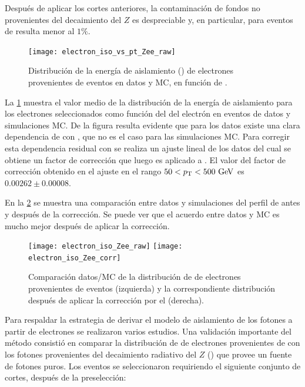Después de aplicar los cortes anteriores, la contaminación de fondos no
provenientes del decaimiento del $Z$ es despreciable y, en particular, para eventos
de {\ttbar} resulta menor al $1\%$.

\begin{figure}[!h]
  \centering

  \texttt{[image: electron\_iso\_vs\_pt\_Zee\_raw]}

  \caption{Distribución de la energía de aislamiento ({\etiso}) de electrones provenientes
    de eventos {\Zee} en datos y MC, en función de {\pt}.}
  \label{fig:isolation_vs_pt}
\end{figure}

La \cref{fig:isolation_vs_pt} muestra el valor medio de la distribución de la energía de
aislamiento para los electrones seleccionados como función del {\pt} del
electrón en eventos de datos y simulaciones MC. De la figura resulta evidente que
para los datos existe una clara dependencia de {\etiso} con {\pt}, que no es el caso
para las simulaciones MC.
Para corregir esta dependencia residual con {\pt} se realiza un ajuste lineal de los
datos del cual se obtiene un factor de corrección que luego es aplicado a {\etiso}.
El valor del factor de corrección
obtenido en el ajuste en el rango $50<\pt<500 \gev$ es $0.00262 \pm 0.00008$.

En la \cref{fig:isolation_wandwo_correction} se muestra una comparación entre
datos y simulaciones del perfil de {\etiso} antes y después de la corrección. Se
puede ver que el acuerdo entre datos y MC es mucho mejor después de aplicar la
corrección.


\begin{figure}[!h]
  \centering

  \texttt{[image: electron\_iso\_Zee\_raw]}
  \texttt{[image: electron\_iso\_Zee\_corr]}

  \caption{Comparación datos/MC de la distribución de {\etiso} de electrones
    provenientes de eventos {\Zee} (izquierda) y la correspondiente distribución
    después de aplicar la corrección por el {\pt} (derecha).}
  \label{fig:isolation_wandwo_correction}
\end{figure}

Para respaldar la estrategia de derivar el modelo de aislamiento de los fotones
a partir de electrones se realizaron varios estudios. Una validación importante
del método consistió en comparar la distribución de {\etiso} de electrones
provenientes de {\Zee} con los fotones provenientes del decaimiento radiativo
del $Z$ (\Zee\gam) que provee un fuente de fotones puros. Los eventos se
seleccionaron requiriendo el siguiente conjunto de cortes, después de la
preselección:

